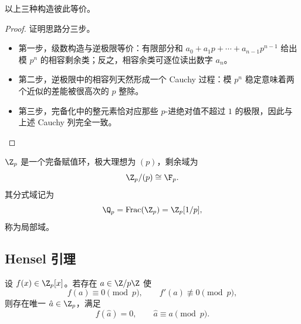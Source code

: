 \begin{proposition}
以上三种构造彼此等价。
\end{proposition}

\begin{proof}
证明思路分三步。
\begin{itemize}
  \item 第一步，级数构造与逆极限等价：有限部分和
  $a_0+a_1p+\cdots+a_{n-1}p^{n-1}$ 给出模 $p^n$ 的相容剩余类；反之，相容余类可逐位读出数字 $a_n$。
  \item 第二步，逆极限中的相容列天然形成一个 Cauchy 过程：模 $p^n$ 稳定意味着两个近似的差能被很高次的 $p$ 整除。
  \item 第三步，完备化中的整元素恰对应那些 $p$-进绝对值不超过 $1$ 的极限，因此与上述 Cauchy 列完全一致。
\end{itemize}
\end{proof}

\begin{proposition}
$\Z_p$ 是一个完备赋值环，极大理想为 $(p)$，剩余域为
\begin{equation}
  \Z_p/(p)\cong \F_p.
\end{equation}
其分式域记为
\begin{equation}
  \Q_p=\mathrm{Frac}(\Z_p)=\Z_p[1/p],
\end{equation}
称为局部域。
\end{proposition}

\subsection{Hensel 引理}

\begin{theorem}[Hensel 引理]
设 $f(x)\in \Z_p[x]$。若存在 $a\in \Z/p\Z$ 使
\begin{equation}
  f(a)\equiv 0\pmod p,
  \qquad
  f'(a)\not\equiv 0\pmod p,
\end{equation}
则存在唯一 $\hat a\in \Z_p$，满足
\begin{equation}
  f(\hat a)=0,
  \qquad
  \hat a\equiv a\pmod p.
\end{equation}
\end{theorem}

